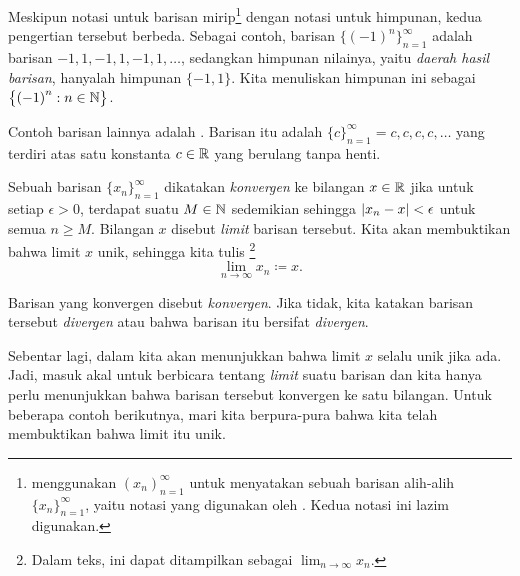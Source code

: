 Meskipun notasi untuk barisan
mirip\footnote{\cite{BS} menggunakan $(x_n)_{n=1}^\infty$ untuk menyatakan
sebuah barisan alih-alih $\{ x_n \}_{n=1}^\infty$, yaitu notasi yang digunakan oleh \cite{Rudin:baby}.
Kedua notasi ini lazim digunakan.}
dengan notasi untuk himpunan, kedua pengertian tersebut
berbeda.  Sebagai contoh, barisan $\bigl\{ {(-1)}^n \bigr\}_{n=1}^\infty$ adalah barisan
$-1,1,-1,1,-1,1,\ldots$, sedangkan himpunan nilainya, yaitu
\emph{daerah hasil barisan},
hanyalah himpunan $\{ -1, 1 \}$.  Kita menuliskan himpunan ini
sebagai $\bigl\{ {(-1)}^n : n \in {\mathbb{N}} \bigr\}$.

Contoh barisan lainnya adalah \emph{}.
Barisan itu adalah $\{ c \}_{n=1}^\infty = c,c,c,c,\ldots$ yang terdiri atas satu
konstanta $c \in {\mathbb{R}}$ yang berulang tanpa henti.


\begin{defn}
Sebuah barisan $\{ x_n \}_{n=1}^\infty$ dikatakan \emph{konvergen} ke bilangan
$x \in {\mathbb{R}}$ jika untuk setiap $\epsilon > 0$, terdapat suatu $M \in {\mathbb{N}}$ sedemikian
sehingga $\lvert {x_n - x} \rvert < \epsilon$ untuk semua $n \geq M$.
Bilangan $x$ disebut \emph{limit} barisan tersebut.
Kita akan membuktikan bahwa limit $x$ unik, sehingga kita tulis%
\footnote{Dalam teks, ini dapat ditampilkan sebagai $\lim_{n\to\infty} x_n$.}
%
\begin{equation*}
\lim_{n\to \infty} x_n \coloneqq x .
\end{equation*}

Barisan
yang konvergen disebut \emph{konvergen}.
Jika tidak, kita katakan barisan tersebut \emph{divergen}
atau bahwa barisan itu bersifat
\emph{divergen}.
\end{defn}

Sebentar lagi, dalam  kita akan menunjukkan bahwa limit $x$ selalu
unik jika ada.  Jadi, masuk akal untuk berbicara tentang \emph{limit} suatu
barisan dan kita hanya perlu menunjukkan bahwa barisan tersebut konvergen ke satu
bilangan.
Untuk beberapa contoh berikutnya, mari kita berpura-pura bahwa
kita telah membuktikan bahwa limit itu unik.

